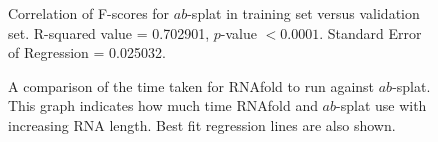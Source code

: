 \documentclass{cshonours}
\begin{document}
\begin{figure}
\begin{center}
\end{center}
\caption{Correlation of F-scores for $ab$-splat in training set versus validation set. R-squared value = 0.702901, $p$-value $< 0.0001$. Standard Error of Regression = 0.025032.}
\label{fig:abcorrelation}
\end{figure}



\begin{figure}
\begin{center}
\end{center}
\caption{A comparison of the time taken for RNAfold to run against $ab$-splat. This graph indicates how much time RNAfold and $ab$-splat use with increasing RNA length. Best fit regression lines are also shown.}
\label{fig:zukerabtime}
\end{figure}
\end{document}
